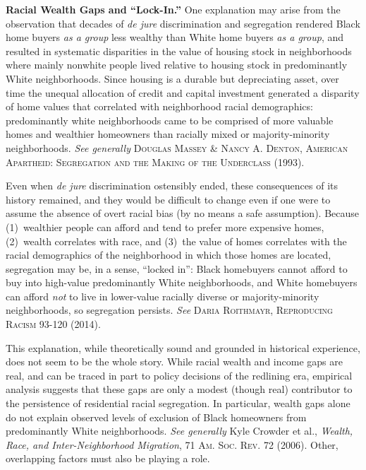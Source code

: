 \begin{questions}[]
\item \textbf{Racial Wealth Gaps and ``Lock-In.''} One explanation may arise
from the observation that decades of \textit{de jure} discrimination and
segregation rendered Black home buyers \textit{as a group} less wealthy than
White home buyers \textit{as a group}, and resulted in systematic disparities
in the value of housing stock in neighborhoods where mainly nonwhite people
lived relative to housing stock in predominantly White neighborhoods. Since
housing is a durable but depreciating asset, over time the unequal allocation
of credit and capital investment generated a disparity of home values that
correlated with neighborhood racial demographics: predominantly white
neighborhoods came to be comprised of more valuable homes and wealthier
homeowners than racially mixed or majority-minority neighborhoods. \textit{See
generally} \textsc{Douglas Massey \& Nancy A. Denton, American Apartheid:
Segregation and the Making of the Underclass} (1993).

Even when \textit{de jure} discrimination ostensibly ended, these consequences
of its history remained, and they would be difficult to change even if one were
to assume the absence of overt racial bias (by no means a safe assumption).
Because (1)~wealthier people can afford and tend to prefer more expensive
homes, (2)~wealth correlates with race, and (3)~the value of homes correlates
with the racial demographics of the neighborhood in which those homes are
located, segregation may be, in a sense, ``locked in'': Black homebuyers cannot
afford to buy into high-value predominantly White neighborhoods, and White
homebuyers can afford \textit{not} to live in lower-value racially diverse or
majority-minority neighborhoods, so segregation persists. \textit{See}
\textsc{Daria Roithmayr, Reproducing Racism} 93-120 (2014).

This explanation, while theoretically sound and grounded in historical
experience, does not seem to be the whole story. While racial wealth and income
gaps are real, and can be traced in part to policy decisions of the redlining
era, empirical analysis suggests that these gaps are only a modest (though
real) contributor to the persistence of residential racial segregation. In
particular, wealth gaps alone do not explain observed levels of exclusion of
Black homeowners from predominantly White neighborhoods. \textit{See generally}
Kyle Crowder et al., \textit{Wealth, Race, and Inter-Neighborhood Migration},
71 \textsc{Am. Soc. Rev.} 72 (2006). Other, overlapping factors must also be
playing a role. 



\end{questions}
